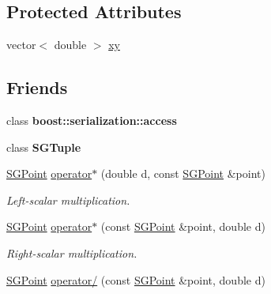 \subsection*{Protected Attributes}
\begin{DoxyCompactItemize}
\item 
vector$<$ double $>$ \hyperlink{class_s_g_point_a3ad7a78283a2797a567575a2a5c3200e}{xy}
\end{DoxyCompactItemize}
\subsection*{Friends}
\begin{DoxyCompactItemize}
\item 
\hypertarget{class_s_g_point_ac98d07dd8f7b70e16ccb9a01abf56b9c}{class {\bfseries boost\+::serialization\+::access}}\label{class_s_g_point_ac98d07dd8f7b70e16ccb9a01abf56b9c}

\item 
\hypertarget{class_s_g_point_ad5f2d71f9c5e1cbf3ba9ed5ae3de7798}{class {\bfseries S\+G\+Tuple}}\label{class_s_g_point_ad5f2d71f9c5e1cbf3ba9ed5ae3de7798}

\item 
\hypertarget{class_s_g_point_a3c878d936b6e5255b1b1b8aedc61e86b}{\hyperlink{class_s_g_point}{S\+G\+Point} \hyperlink{class_s_g_point_a3c878d936b6e5255b1b1b8aedc61e86b}{operator$\ast$} (double d, const \hyperlink{class_s_g_point}{S\+G\+Point} \&point)}\label{class_s_g_point_a3c878d936b6e5255b1b1b8aedc61e86b}

\begin{DoxyCompactList}\small\item\em Left-\/scalar multiplication. \end{DoxyCompactList}\item 
\hypertarget{class_s_g_point_a6744606b8f8713122dd7a1cf322f9af1}{\hyperlink{class_s_g_point}{S\+G\+Point} \hyperlink{class_s_g_point_a6744606b8f8713122dd7a1cf322f9af1}{operator$\ast$} (const \hyperlink{class_s_g_point}{S\+G\+Point} \&point, double d)}\label{class_s_g_point_a6744606b8f8713122dd7a1cf322f9af1}

\begin{DoxyCompactList}\small\item\em Right-\/scalar multiplication. \end{DoxyCompactList}\item 
\hypertarget{class_s_g_point_ad112619c55afac0b026c236a9901e001}{\hyperlink{class_s_g_point}{S\+G\+Point} \hyperlink{class_s_g_point_ad112619c55afac0b026c236a9901e001}{operator/} (const \hyperlink{class_s_g_point}{S\+G\+Point} \&point, double d)}\label{class_s_g_point_ad112619c55afac0b026c236a9901e001}


\end{DoxyCompactItemize}
